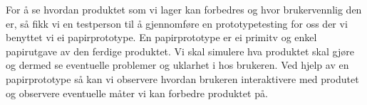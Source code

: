 For å se hvordan produktet som vi lager kan forbedres og hvor brukervennlig den er, så fikk vi en testperson til å gjennomføre en prototypetesting for oss der vi benyttet vi ei papirprototype. En papirprototype  er ei primitv og enkel papirutgave av den ferdige produktet. Vi skal simulere hva produktet skal gjøre og dermed se eventuelle problemer og uklarhet i hos brukeren. Ved hjelp av en papirprototype så kan vi observere hvordan brukeren interaktivere med produtet og observere eventuelle måter vi kan forbedre produktet på. 
